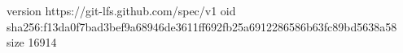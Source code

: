 version https://git-lfs.github.com/spec/v1
oid sha256:f13da0f7bad3bef9a68946de3611ff692fb25a6912286586b63fc89bd5638a58
size 16914
